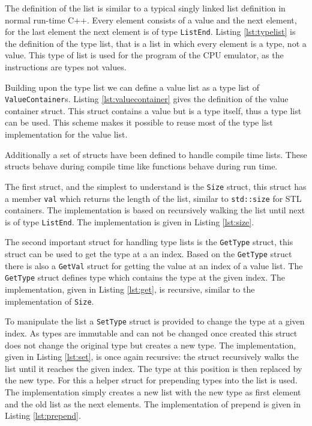 The definition of the list is similar to a typical singly linked list definition in normal run-time C++. Every
element consists of a value and the next element, for the last element the next element is of type \lstinline{ListEnd}.
Listing \ref{lst:typelist} is the definition of the type list, that is a list in which every element is a type, not
a value. This type of list is used for the program of the CPU emulator, as the instructions are types not values.



Building upon the type list we can define a value list as a type list of \lstinline{ValueContainer}s. Listing
\ref{lst:valuecontainer} gives the definition of the value container struct. This struct contains a value but
is a type itself, thus a type list can be used. This scheme makes it possible to reuse most of the type list
implementation for the value list.



Additionally a set of structs have been defined to handle compile time lists. These structs behave during compile time like 
functions behave during run time. 

The first struct, and the simplest to understand is the \lstinline{Size} struct, this
struct has a member \lstinline{val} which returns the length of the list, similar to 
\lstinline{std::size} for STL containers. The implementation is based on recursively 
walking the list until next is of type \lstinline{ListEnd}. The implementation is given
in Listing \ref{lst:size}.



The second important struct for handling type lists is the \lstinline{GetType} struct,
this struct can be used to get the type at a an index. Based on the \lstinline{GetType}
struct there is also a \lstinline{GetVal} struct for getting the value at an index of
a value list. The \lstinline{GetType} struct defines type which contains the type
at the given index. The implementation, given in Listing \ref{lst:get}, 
is recursive, similar to the implementation of \lstinline{Size}.



To manipulate the list a \lstinline{SetType} struct is provided to change the type at 
a given index. As types are immutable and can not be changed once created this struct
does not change the original type but creates a new type. The implementation, given
in Listing \ref{lst:set}, is once again recursive: 
the struct recursively walks the list until it reaches the given index. The
type at this position is then replaced by the new type. For this a helper struct for 
prepending types into the list is used.
The implementation simply creates a new list with the new type as first element
and the old list as the next elements. The implementation of prepend is given
in Listing \ref{lst:prepend}.


